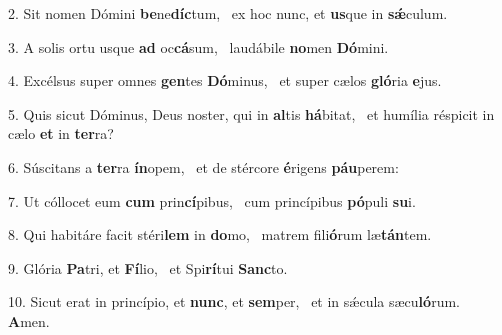 2. Sit nomen Dómini \textbf{be}ne\textbf{díc}tum, \ast\  ex hoc nunc, et \textbf{us}que in \textbf{sǽ}culum.\

3. A solis ortu usque \textbf{ad} oc\textbf{cá}sum, \ast\  laudábile \textbf{no}men \textbf{Dó}mini.\

4. Excélsus super omnes \textbf{gen}tes \textbf{Dó}minus, \ast\  et super cælos \textbf{gló}ria \textbf{e}jus.\

5. Quis sicut Dóminus, Deus noster, qui in \textbf{al}tis \textbf{há}bitat, \ast\  et humília réspicit in cælo \textbf{et} in \textbf{ter}ra?\

6. Súscitans a \textbf{ter}ra \textbf{ín}opem, \ast\  et de stércore \textbf{é}rigens \textbf{páu}perem:\

7. Ut cóllocet eum \textbf{cum} prin\textbf{cí}pibus, \ast\  cum princípibus \textbf{pó}puli \textbf{su}i.\

8. Qui habitáre facit stéri\textbf{lem} in \textbf{do}mo, \ast\  matrem fili\textbf{ó}rum læ\textbf{tán}tem.\

9. Glória \textbf{Pa}tri, et \textbf{Fí}lio, \ast\  et Spi\textbf{rí}tui \textbf{Sanc}to.\

10. Sicut erat in princípio, et \textbf{nunc}, et \textbf{sem}per, \ast\  et in sǽcula sæcu\textbf{ló}rum. \textbf{A}men.\

